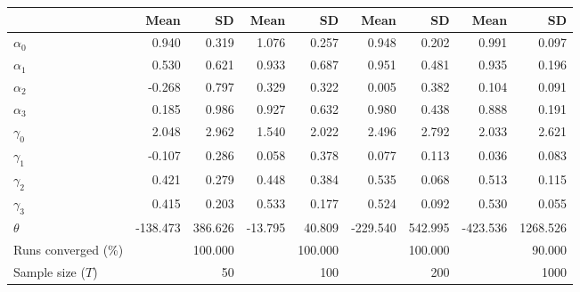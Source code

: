 
\begin{tabular}[t]{lrrrrrrrr}
\toprule
  & Mean & SD & Mean  & SD  & Mean   & SD   & Mean    & SD   \\
\midrule
$\alpha_{0}$ & 0.940 & 0.319 & 1.076 & 0.257 & 0.948 & 0.202 & 0.991 & 0.097\\
$\alpha_{1}$ & 0.530 & 0.621 & 0.933 & 0.687 & 0.951 & 0.481 & 0.935 & 0.196\\
$\alpha_{2}$ & -0.268 & 0.797 & 0.329 & 0.322 & 0.005 & 0.382 & 0.104 & 0.091\\
$\alpha_{3}$ & 0.185 & 0.986 & 0.927 & 0.632 & 0.980 & 0.438 & 0.888 & 0.191\\
$\gamma_{0}$ & 2.048 & 2.962 & 1.540 & 2.022 & 2.496 & 2.792 & 2.033 & 2.621\\
$\gamma_{1}$ & -0.107 & 0.286 & 0.058 & 0.378 & 0.077 & 0.113 & 0.036 & 0.083\\
$\gamma_{2}$ & 0.421 & 0.279 & 0.448 & 0.384 & 0.535 & 0.068 & 0.513 & 0.115\\
$\gamma_{3}$ & 0.415 & 0.203 & 0.533 & 0.177 & 0.524 & 0.092 & 0.530 & 0.055\\
$\theta$ & -138.473 & 386.626 & -13.795 & 40.809 & -229.540 & 542.995 & -423.536 & 1268.526\\
Runs converged (\%) &  & 100.000 &  & 100.000 &  & 100.000 &  & 90.000\\
Sample size ($T$) &  & 50 &  & 100 &  & 200 &  & 1000\\
\bottomrule
\end{tabular}
